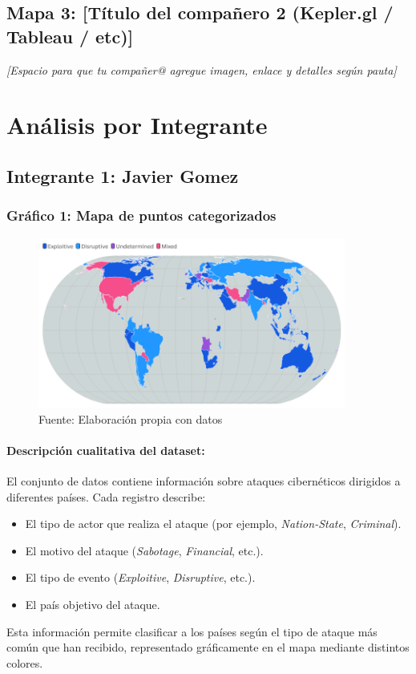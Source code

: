 \documentclass[12pt, a4paper]{article}
\begin{document}
\vspace{1em}
\subsection*{Mapa 3: [Título del compañero 2 (Kepler.gl / Tableau / etc)]}
\textit{[Espacio para que tu compañer@ agregue imagen, enlace y detalles según pauta]}

\section*{Análisis por Integrante}

\subsection*{Integrante 1: Javier Gomez}


\subsubsection*{Gráfico 1: Mapa de puntos categorizados}
\begin{figure}[H]
    \centering
    \includegraphics[width=0.9\textwidth]{images/punto_cate.png}
    \caption{Fuente: Elaboración propia con datos}
\end{figure}

\paragraph{Descripción cualitativa del dataset:}

El conjunto de datos contiene información sobre ataques cibernéticos dirigidos a diferentes países. Cada registro describe:
\begin{itemize}
    \item El tipo de actor que realiza el ataque (por ejemplo, \textit{Nation-State}, \textit{Criminal}).
    \item El motivo del ataque (\textit{Sabotage}, \textit{Financial}, etc.).
    \item El tipo de evento (\textit{Exploitive}, \textit{Disruptive}, etc.).
    \item El país objetivo del ataque.
\end{itemize}
Esta información permite clasificar a los países según el tipo de ataque más común que han recibido, representado gráficamente en el mapa mediante distintos colores.
\end{document}
